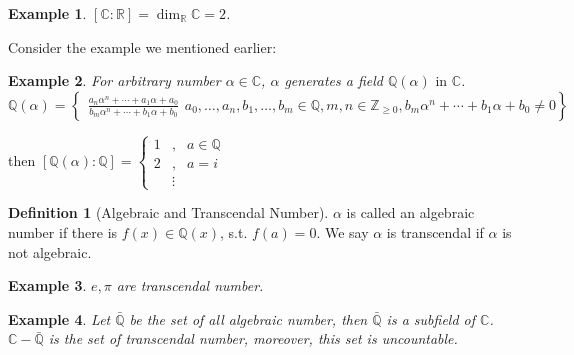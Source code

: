 \documentclass{article}
\theoremstyle{MyNonumberplain}
\theoremstyle{break}
\theoremstyle{break}
\newtheorem{example}{Example}[section]
\theoremstyle{break}
\theoremstyle{definition}
\theoremstyle{break}
\newtheorem{definition}{Definition}[section]
\begin{document}
\begin{expbox}
    \begin{example}
        $[\mathbb{C}: \mathbb{R}] = \dim_{\mathbb{R}} \mathbb{C}= 2$.
    \end{example}
\end{expbox}

Consider the example we mentioned earlier:
\begin{expbox}
    \begin{example}
        For arbitrary number $\alpha \in \mathbb{C}$, $\alpha$ generates a field
        $\mathbb{Q} (\alpha) \text{ in } \mathbb{C}$.
        \[ \mathbb{Q} (\alpha) = \left\{ \begin{array}{c|}
             \frac{a_n \alpha^n + \cdots + a_1 \alpha + a_0}{b_m \alpha^n + \cdots +
             b_1 \alpha + b_0}
           \end{array} a_0, \ldots, a_n, b_1, \ldots, b_m \in \mathbb{Q}, m, n \in
           \mathbb{Z}_{\geq 0}, b_m \alpha^n + \cdots + b_1 \alpha + b_0 \neq 0
           \right\} \]
    \end{example}
\end{expbox}
then $[\mathbb{Q} (\alpha) : \mathbb{Q}] = \left\{\begin{array}{lll}
    1 & , & a \in \mathbb{Q}\\
    2 & , & a = i\\
    & \vdots & 
\end{array}\right.$

\begin{defbox}
    \begin{definition}[Algebraic and Transcendal Number]
        $\alpha$ is called an algebraic number if there is $f (x) \in \mathbb{Q} (x)$,
        s.t. $f (a) = 0$. We say $\alpha$ is transcendal if $\alpha$ is not algebraic.
        
    \end{definition}
\end{defbox}

\begin{expbox}
    \begin{example}
        $e, \pi$ are transcendal number. 
    \end{example}
\end{expbox}

\begin{expbox}
    \begin{example}
        Let $\bar{\mathbb{Q}}$ be the set of all algebraic number, then
        $\bar{\mathbb{Q}}$ is a subfield of $\mathbb{C}$.\\ 
        
        $\mathbb{C}- \bar{\mathbb{Q}}$ is the set of transcendal number, moreover,
        this set is uncountable.
    \end{example}
\end{expbox}
\end{document}
